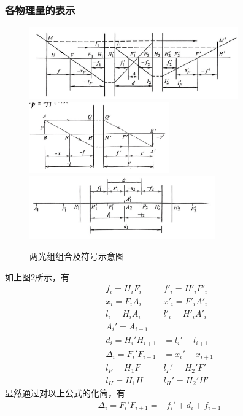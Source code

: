 \subsubsection{各物理量的表示}
        \begin{figure}[H]
            \centering
            \includegraphics[width=9cm]{img/3.12.png}
            \includegraphics[width=6cm]{img/3.13.png}
            \includegraphics[width=8cm]{img/3.14.png}
            \caption[图2.1]{两光组组合及符号示意图}
            \end{figure}
如上图2所示，有
\begin{align}
 f_{i}=H_{i}F_{i} \quad& f'_{i}=H'_{i}F'_{i} \tag{3.2.5.a}\\
 x_{i}=F_{i}A_{i} \quad& x'_{i}=F'_{i}A'_{i} \tag{3.2.5.b}\\
 l_i=H_iA_i \quad& l'_i=H'_iA'_i \tag{3.2.5.c}\\
 A_i'=A_{i+1}& \tag{3.2.5.d}\\
 d_i=H_{i}'H_{i+1} &=l_{i}'-l_{i+1}\tag{3.2.5.e}\\
 \Delta_i=F_{i}'F_{i+1}&=x_i'-x_{i+1} \tag{3.2.5.f}\\
 l_{F}=H_1 F \quad & l_{F}'=H_2' F' \tag{3.2.5.g}\\
 l_{H}=H_1 H \quad & l_{H}'=H_2' H' \tag{3.2.5.h}
\end{align}
显然通过对以上公式的化简，有
    \begin{align}
        \Delta_i=F_{i}'F_{i+1}=-f_i'+d_{i}+f_{i+1} \tag{3.2.6.a}
    \end{align}
